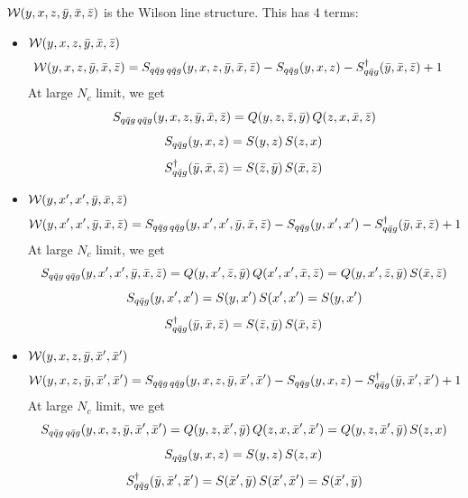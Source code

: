 \documentclass[9pt]{article}
\numberwithin{equation}{section}
\begin{document}
$\mathcal{W}(y,x,z,\Bar{y},\Bar{x},\Bar{z})$ is the Wilson line structure. This has 4 terms:
\begin{itemize}
    \item $\mathcal{W}(y,x,z,\Bar{y},\Bar{x},\Bar{z})$
    \begin{align}
        \mathcal{W}(y,x,z,\Bar{y},\Bar{x},\Bar{z}) & = S_{q\Bar{q}g\,q\Bar{q}g}(y,x,z,\Bar{y},\Bar{x},\Bar{z}) -S_{q\Bar{q}g}(y,x,z) - S^{\dagger}_{q\Bar{q}g}(\Bar{y},\Bar{x},\Bar{z}) + 1
    \end{align}
At large $N_{c}$ limit, we get
$$S_{q\Bar{q}g\,q\Bar{q}g}(y,x,z,\Bar{y},\Bar{x},\Bar{z}) = Q(y,z,\Bar{z},\Bar{y})\, Q(z,x,\Bar{x},\Bar{z})$$
$$S_{q\Bar{q}g}(y,x,z) = S(y,z)\, S(z,x)$$
$$S^{\dagger}_{q\Bar{q}g}(\Bar{y},\Bar{x},\Bar{z}) = S(\Bar{z},\Bar{y})\, S(\Bar{x},\Bar{z})$$
\item $\mathcal{W}(y,x',x',\Bar{y},\Bar{x},\Bar{z})$
\begin{align}
        \mathcal{W}(y,x',x',\Bar{y},\Bar{x},\Bar{z}) & = S_{q\Bar{q}g\,q\Bar{q}g}(y,x',x',\Bar{y},\Bar{x},\Bar{z}) -S_{q\Bar{q}g}(y,x',x') - S^{\dagger}_{q\Bar{q}g}(\Bar{y},\Bar{x},\Bar{z}) + 1
    \end{align}
At large $N_{c}$ limit, we get
$$S_{q\Bar{q}g\,q\Bar{q}g}(y,x',x',\Bar{y},\Bar{x},\Bar{z}) = Q(y,x',\Bar{z},\Bar{y})\, Q(x',x',\Bar{x},\Bar{z}) = Q(y,x',\Bar{z},\Bar{y})\, S(\Bar{x},\Bar{z})$$
$$S_{q\Bar{q}g}(y,x',x') = S(y,x')\, S(x',x') = S(y,x') $$
$$S^{\dagger}_{q\Bar{q}g}(\Bar{y},\Bar{x},\Bar{z}) = S(\Bar{z},\Bar{y})\, S(\Bar{x},\Bar{z})$$
\item $\mathcal{W}(y,x,z,\Bar{y},\Bar{x}',\Bar{x}')$
\begin{align}
        \mathcal{W}(y,x,z,\Bar{y},\Bar{x}',\Bar{x}') & = S_{q\Bar{q}g\,q\Bar{q}g}(y,x,z,\Bar{y},\Bar{x}',\Bar{x}') -S_{q\Bar{q}g}(y,x,z) - S^{\dagger}_{q\Bar{q}g}(\Bar{y},\Bar{x}',\Bar{x}') + 1
    \end{align}
At large $N_{c}$ limit, we get
$$S_{q\Bar{q}g\,q\Bar{q}g}(y,x,z,\Bar{y},\Bar{x}',\Bar{x}') = Q(y,z,\Bar{x}',\Bar{y})\, Q(z,x,\Bar{x}',\Bar{x}') = Q(y,z,\Bar{x}',\Bar{y})\, S(z,x) $$
$$S_{q\Bar{q}g}(y,x,z) = S(y,z)\, S(z,x)$$
$$S^{\dagger}_{q\Bar{q}g}(\Bar{y},\Bar{x}',\Bar{x}') = S(\Bar{x}',\Bar{y})\, S(\Bar{x}',\Bar{x}') = S(\Bar{x}',\Bar{y})$$

\end{itemize}
\end{document}
